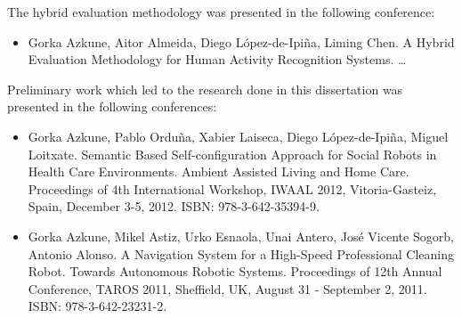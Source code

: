 The hybrid evaluation methodology was presented in the following conference:

\begin{itemize}
 \item Gorka Azkune, Aitor Almeida, Diego López-de-Ipiña, Liming Chen. A Hybrid Evaluation Methodology for Human Activity Recognition Systems. \ldots
\end{itemize}

Preliminary work which led to the research done in this dissertation was presented in the following conferences:

\begin{itemize}
 \item Gorka Azkune, Pablo Orduña, Xabier Laiseca, Diego López-de-Ipiña, Miguel Loitxate. Semantic Based Self-configuration Approach for Social Robots in Health Care Environments. Ambient Assisted Living and Home Care. Proceedings of 4th International Workshop, IWAAL 2012, Vitoria-Gasteiz, Spain, December 3-5, 2012. ISBN: 978-3-642-35394-9.
 \item Gorka Azkune, Mikel Astiz, Urko Esnaola, Unai Antero, José Vicente Sogorb, Antonio Alonso. A Navigation System for a High-Speed Professional Cleaning Robot. Towards Autonomous Robotic Systems. Proceedings of 12th Annual Conference, TAROS 2011, Sheffield, UK, August 31 - September 2, 2011. ISBN: 978-3-642-23231-2.
\end{itemize}


